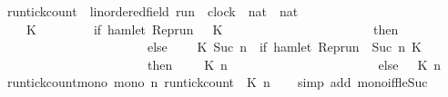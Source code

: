 \begin{isabellebody}
\begin{isamarkuptext}
\end{isamarkuptext}\isamarkuptrue%
\isamarkupfalse%
\ run{\isacharunderscore}tick{\isacharunderscore}count\ {\isacharcolon}{\isacharcolon}\ {\isacartoucheopen}{\isacharparenleft}{\isacharprime}{\isasymtau}{\isacharcolon}{\isacharcolon}linordered{\isacharunderscore}field{\isacharparenright}\ run\ {\isasymRightarrow}\ clock\ {\isasymRightarrow}\ nat\ {\isasymRightarrow}\ nat{\isacartoucheclose}\isanewline
\ \ {\isacharparenleft}{\isacartoucheopen}{\isacharhash}\isactrlsub {\isasymle}\ {\isacharunderscore}\ {\isacharunderscore}\ {\isacharunderscore}{\isacartoucheclose}{\isacharparenright}\isanewline
{}\isanewline
\ \ {\isacartoucheopen}{\isacharparenleft}{\isacharhash}\isactrlsub {\isasymle}\ {\isasymrho}\ K\ {}{\isacharparenright}\ \ \ \ \ \ \ {\isacharequal}\ {\isacharparenleft}if\ hamlet\ {\isacharparenleft}{\isacharparenleft}Rep{\isacharunderscore}run\ {\isasymrho}{\isacharparenright}\ {}\ K{\isacharparenright}\isanewline
\ \ \ \ \ \ \ \ \ \ \ \ \ \ \ \ \ \ \ \ \ \ \ then\ {}\isanewline
\ \ \ \ \ \ \ \ \ \ \ \ \ \ \ \ \ \ \ \ \ \ \ else\ {}{\isacharparenright}{\isacartoucheclose}\isanewline
{\isacharbar}\ {\isacartoucheopen}{\isacharparenleft}{\isacharhash}\isactrlsub {\isasymle}\ {\isasymrho}\ K\ {\isacharparenleft}Suc\ n{\isacharparenright}{\isacharparenright}\ {\isacharequal}\ {\isacharparenleft}if\ hamlet\ {\isacharparenleft}{\isacharparenleft}Rep{\isacharunderscore}run\ {\isasymrho}{\isacharparenright}\ {\isacharparenleft}Suc\ n{\isacharparenright}\ K{\isacharparenright}\isanewline
\ \ \ \ \ \ \ \ \ \ \ \ \ \ \ \ \ \ \ \ \ \ \ then\ {}\ {\isacharplus}\ {\isacharparenleft}{\isacharhash}\isactrlsub {\isasymle}\ {\isasymrho}\ K\ n{\isacharparenright}\isanewline
\ \ \ \ \ \ \ \ \ \ \ \ \ \ \ \ \ \ \ \ \ \ \ else\ {\isacharparenleft}{\isacharhash}\isactrlsub {\isasymle}\ {\isasymrho}\ K\ n{\isacharparenright}{\isacharparenright}{\isacartoucheclose}\isanewline
\isanewline
{}\isamarkupfalse%
\ run{\isacharunderscore}tick{\isacharunderscore}count{\isacharunderscore}mono{\isacharcolon}\ {\isacartoucheopen}mono\ {\isacharparenleft}{\isasymlambda}n{\isachardot}\ run{\isacharunderscore}tick{\isacharunderscore}count\ {\isasymrho}\ K\ n{\isacharparenright}{\isacartoucheclose}\isanewline
%
\isadelimproof
\ \ %
\endisadelimproof
%
\isatagproof
{}\isamarkupfalse%
\ {\isacharparenleft}simp\ add{\isacharcolon}\ mono{\isacharunderscore}iff{\isacharunderscore}le{\isacharunderscore}Suc{\isacharparenright}%
\endisatagproof

\end{isabellebody}
